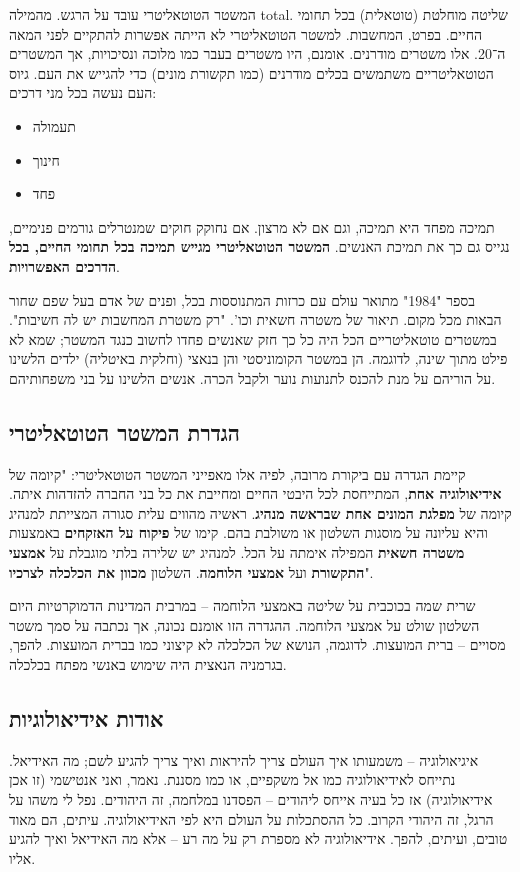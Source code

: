 \documentclass[]{article}
\begin{document}
	המשטר הטוטאליטרי עובד על הרגש. מהמילה total. שליטה מוחלטת (טוטאלית) בכל תחומי החיים. בפרט, המחשבות. 
	למשטר הטוטאליטרי לא הייתה אפשרות להתקיים לפני המאה ה־20. אלו משטרים מודרנים. אומנם, היו משטרים בעבר כמו מלוכה ונסיכויות, אך המשטרים הטוטאליטריים משתמשים בכלים מודרנים (כמו תקשורת מונים) כדי להגייש את העם. גיוס העם נעשה בכל מני דרכים: 
	\begin{multicols}{2}
		\begin{itemize}
			\item תעמולה
			\item חינוך
			\item פחד
		\end{itemize}
	\end{multicols}
	תמיכה מפחד היא תמיכה, וגם אם לא מרצון. אם נחוקק חוקים שמנטרלים גורמים פנימיים, נגייס גם כך את תמיכת האנשים. \textbf{המשטר הטוטאליטרי מגייש תמיכה בכל תחומי החיים, בכל הדרכים האפשרויות}. 
	
	בספר "1984" מתואר עולם עם כרזות המתנוססות בכל, ופנים של אדם בעל שפם שחור הבאות מכל מקום. תיאור של משטרה חשאית וכו'. "רק משטרת המחשבות יש לה חשיבות". במשטרים טוטאליטריים הכל היה כל כך חזק שאנשים פחדו לחשוב כנגד המשטר; שמא לא פילט מתוך שינה, לדוגמה. הן במשטר הקומוניסטי והן בנאצי (וחלקית באיטליה) ילדים הלשינו על הוריהם על מנת להכנס לתנועות נוער ולקבל הכרה. אנשים הלשינו על בני משפחותיהם. 
	
	\subsection{הגדרת המשטר הטוטאליטרי}
	
	קיימת הגדרה עם ביקורת מרובה, לפיה אלו מאפייני המשטר הטוטאליטרי: "קיומה של \textbf{אידיאולוגיה אחת}, המתייחסת לכל היבטי החיים ומחייבת את כל בני החברה להזדהות איתה. קיומה של \textbf{מפלגת המונים אחת שבראשה מנהיג}. ראשיה מהווים עלית סגורה המצייתת למנהיג והיא עליונה על מוסגות השלטון או משולבת בהם. קימו של \textbf{פיקוח על האזקחים} באמצעות \textbf{משטרה חשאית} המפילה אימתה על הכל. למנהיג יש שלירה בלתי מוגבלת על \textbf{אמצעי התקשורת}  ועל \textbf{אמצעי הלוחמה}. השלטון \textbf{מכוון את הכלכלה לצרכיו}". 
	
	שרית שמה בכוכבית על שליטה באמצעי הלוחמה – במרבית המדינות הדמוקרטיות היום השלטון שולט על אמצעי הלוחמה. ההגדרה הזו אומנם נכונה, אך נכתבה על סמך משטר מסויים – ברית המועצות. לדוגמה, הנושא של הכלכלה לא קיצוני כמו בברית המועצות. להפך, בגרמניה הנאצית היה שימוש באנשי מפתח בכלכלה. 
	
	\subsection{אודות אידיאולוגיות}
	איגיאולוגיה – משמעותו איך העולם צריך להיראות ואיך צריך להגיע לשם; מה האידיאל. נתייחס לאידיאולוגיה כמו אל משקפיים, או כמו מסננת. נאמר, ואני אנטישמי (זו אכן אידיאולוגיה) אז כל בעיה אייחס ליהודים – הפסדנו במלחמה, זה היהודים. נפל לי משהו על הרגל, זה היהודי הקרוב. כל ההסתכלות על העולם היא לפי האידיאולוגיה. עיתים, הם מאוד טובים, ועיתים, להפך. אידיאולוגיה לא מספרת רק על מה רע – אלא מה האידיאל ואיך להגיע אליו. 
	
\end{document}
